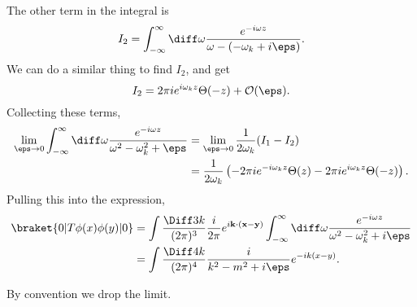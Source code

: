 \documentclass[12pt]{article}
\begin{document}
\begin{proofbox}
	The other term in the integral is
	\[
	I_2 = \int_{-\infty}^{\infty} \diff \omega \frac{e^{-i \omega z}}{\omega - (-\omega_k + i \eps)}.
	\]
	We can do a similar thing to find $I_2$, and get
	\[
	I_2 = 2 \pi i e^{i \omega_k z} \Theta(-z) + \mathcal{O}(\eps).
	\]
	Collecting these terms,
	\begin{align*}
		\lim_{\eps \to 0} \int_{-\infty}^{\infty} \diff \omega \frac{e^{-i\omega z}}{\omega^2 - \omega_k^2 + \eps} &= \lim_{\eps \to 0} \frac{1}{2 \omega_k} (I_1 - I_2) \\
															   &= \frac{1}{2 \omega_k} \left(- 2 \pi i e^{-i \omega_k z} \Theta(z) - 2 \pi i e^{i \omega_k z} \Theta(-z) \right).
	\end{align*}
	Pulling this into the expression,
	\begin{align*}
		\braket{0|T\phi(x)\phi(y)|0} &= \int \frac{\Diff 3 k}{(2 \pi)^3} \frac{i}{2 \pi} e^{i \mathbf{k} \cdot (\mathbf{x} - \mathbf{y})} \int_{-\infty}^{\infty} \diff \omega \frac{e^{-i \omega z}}{\omega^2 - \omega_k^2 + i \eps} \\
					     &= \int \frac{\Diff 4 k}{(2 \pi)^{4}} \frac{i}{k^2 - m^2 + i \eps} e^{-i k(x - y)}.
	\end{align*}
\end{proofbox}

By convention we drop the limit.
\end{document}
